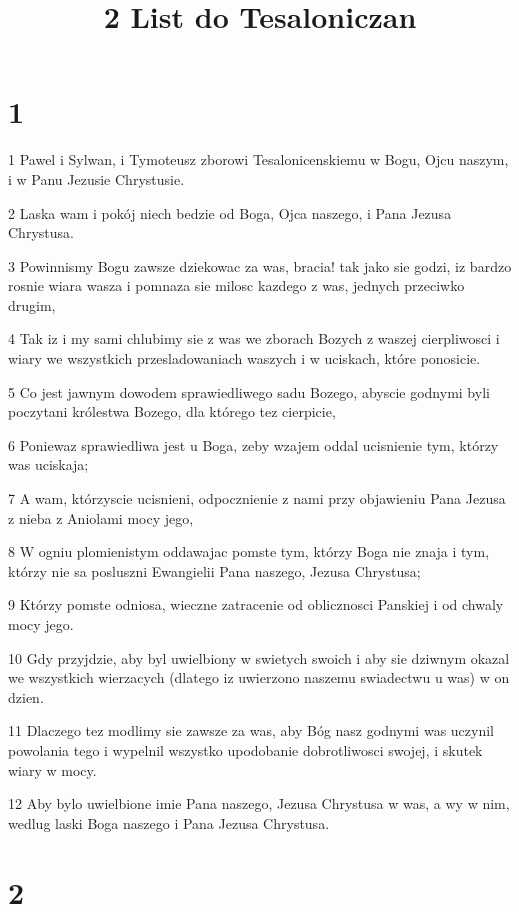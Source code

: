 

\title{2 List do Tesaloniczan}


\chapter{1}

\par 1 Pawel i Sylwan, i Tymoteusz zborowi Tesalonicenskiemu w Bogu, Ojcu naszym, i w Panu Jezusie Chrystusie.
\par 2 Laska wam i pokój niech bedzie od Boga, Ojca naszego, i Pana Jezusa Chrystusa.
\par 3 Powinnismy Bogu zawsze dziekowac za was, bracia! tak jako sie godzi, iz bardzo rosnie wiara wasza i pomnaza sie milosc kazdego z was, jednych przeciwko drugim,
\par 4 Tak iz i my sami chlubimy sie z was we zborach Bozych z waszej cierpliwosci i wiary we wszystkich przesladowaniach waszych i w uciskach, które ponosicie.
\par 5 Co jest jawnym dowodem sprawiedliwego sadu Bozego, abyscie godnymi byli poczytani królestwa Bozego, dla którego tez cierpicie,
\par 6 Poniewaz sprawiedliwa jest u Boga, zeby wzajem oddal ucisnienie tym, którzy was uciskaja;
\par 7 A wam, którzyscie ucisnieni, odpocznienie z nami przy objawieniu Pana Jezusa z nieba z Aniolami mocy jego,
\par 8 W ogniu plomienistym oddawajac pomste tym, którzy Boga nie znaja i tym, którzy nie sa posluszni Ewangielii Pana naszego, Jezusa Chrystusa;
\par 9 Którzy pomste odniosa, wieczne zatracenie od oblicznosci Panskiej i od chwaly mocy jego.
\par 10 Gdy przyjdzie, aby byl uwielbiony w swietych swoich i aby sie dziwnym okazal we wszystkich wierzacych (dlatego iz uwierzono naszemu swiadectwu u was) w on dzien.
\par 11 Dlaczego tez modlimy sie zawsze za was, aby Bóg nasz godnymi was uczynil powolania tego i wypelnil wszystko upodobanie dobrotliwosci swojej, i skutek wiary w mocy.
\par 12 Aby bylo uwielbione imie Pana naszego, Jezusa Chrystusa w was, a wy w nim, wedlug laski Boga naszego i Pana Jezusa Chrystusa.

\chapter{2}

